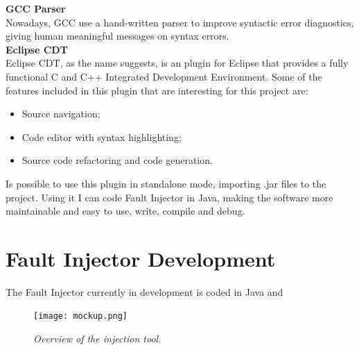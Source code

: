 \textbf{GCC Parser}\\

Nowadays, GCC use a hand-written parser to improve syntactic error diagnostics, giving human meaningful messages on syntax errors.\\

\textbf{Eclipse CDT}\\

Eclipse CDT, as the name suggests, is an plugin for Eclipse that provides a fully functional C and C++ Integrated Development Environment.
Some of the features included in this plugin that are interesting for this project are:
\begin{itemize}
	\item Source navigation;
	\item Code editor with syntax highlighting;
	\item Source code refactoring and code generation.
\end{itemize}

Is possible to use this plugin in standalone mode, importing .jar files to the project.
Using it I can code Fault Injector in Java, making the software more maintainable and easy to use, write, compile and debug.
\\





\newpage
\section{Fault Injector Development}

The Fault Injector currently in development is coded in Java and

\begin{figure}[!ht]
\begin{center}
\texttt{[image: mockup.png]}
\caption{\small \sl Overview of the injection tool.\label{fig:mockup}}
\end{center}
\end{figure}

